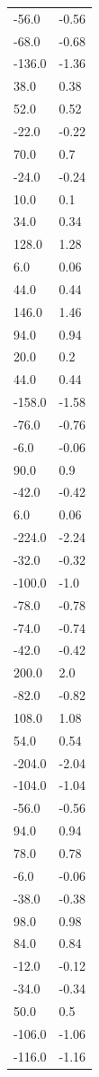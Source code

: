 \begin{longtable}{ll}
-56.0 & -0.56 \\
-68.0 & -0.68 \\
-136.0 & -1.36 \\
38.0 & 0.38 \\
52.0 & 0.52 \\
-22.0 & -0.22 \\
70.0 & 0.7 \\
-24.0 & -0.24 \\
10.0 & 0.1 \\
34.0 & 0.34 \\
128.0 & 1.28 \\
6.0 & 0.06 \\
44.0 & 0.44 \\
146.0 & 1.46 \\
94.0 & 0.94 \\
20.0 & 0.2 \\
44.0 & 0.44 \\
-158.0 & -1.58 \\
-76.0 & -0.76 \\
-6.0 & -0.06 \\
90.0 & 0.9 \\
-42.0 & -0.42 \\
6.0 & 0.06 \\
-224.0 & -2.24 \\
-32.0 & -0.32 \\
-100.0 & -1.0 \\
-78.0 & -0.78 \\
-74.0 & -0.74 \\
-42.0 & -0.42 \\
200.0 & 2.0 \\
-82.0 & -0.82 \\
108.0 & 1.08 \\
54.0 & 0.54 \\
-204.0 & -2.04 \\
-104.0 & -1.04 \\
-56.0 & -0.56 \\
94.0 & 0.94 \\
78.0 & 0.78 \\
-6.0 & -0.06 \\
-38.0 & -0.38 \\
98.0 & 0.98 \\
84.0 & 0.84 \\
-12.0 & -0.12 \\
-34.0 & -0.34 \\
50.0 & 0.5 \\
-106.0 & -1.06 \\
-116.0 & -1.16 \\

\end{longtable}
